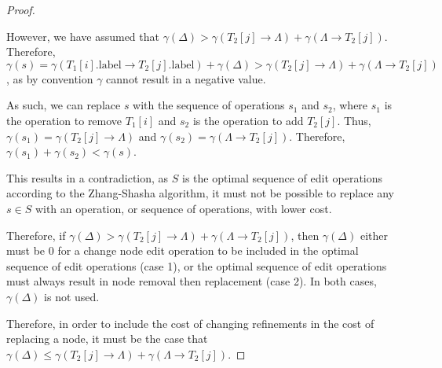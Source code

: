 \begin{lemma}
\begin{proof}
\begin{enumerate}
However, we have assumed that $\gamma(\Delta) > \gamma(T_2[j] \rightarrow {\Lambda}) + \gamma(\Lambda \rightarrow {T_2[j]})$. Therefore, $\gamma(s) = \gamma({T_1[i].\text{label}} \rightarrow {T_2[j].\text{label}}) + \gamma(\Delta) > \gamma(T_2[j] \rightarrow {\Lambda}) + \gamma(\Lambda \rightarrow {T_2[j]})$, as by convention $\gamma$ cannot result in a negative value.

As such, we can replace $s$ with the sequence of operations $s_1$ and $s_2$, where $s_1$ is the operation to remove $T_1[i]$ and $s_2$ is the operation to add $T_2[j]$. Thus, $\gamma(s_1) = \gamma(T_2[j] \rightarrow {\Lambda})$ and $\gamma(s_2) = \gamma(\Lambda \rightarrow {T_2[j]})$. Therefore, $\gamma(s_1) + \gamma(s_2) < \gamma(s)$.

This results in a contradiction, as $S$ is the optimal sequence of edit operations according to the Zhang-Shasha algorithm, it must not be possible to replace any $s \in S$ with an operation, or sequence of operations, with lower cost.
\end{enumerate}

Therefore, if $\gamma(\Delta) > \gamma(T_2[j] \rightarrow {\Lambda}) + \gamma(\Lambda \rightarrow {T_2[j]})$, then $\gamma(\Delta)$ either must be 0 for a change node edit operation to be included in the optimal sequence of edit operations (case 1), or the optimal sequence of edit operations must always result in node removal then replacement (case 2). In both cases, $\gamma(\Delta)$ is not used. 

Therefore, in order to include the cost of changing refinements in the cost of replacing a node, it must be the case that $\gamma(\Delta) \le \gamma(T_2[j] \rightarrow {\Lambda}) + \gamma(\Lambda \rightarrow {T_2[j]})$.


\end{proof}


\end{lemma}






